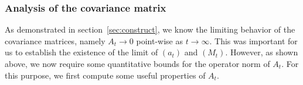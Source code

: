 
\subsubsection{Analysis of the covariance matrix}

As demonstrated in section~\ref{sec:construct}, we know the limiting behavior of the covariance matrices, namely 
\(A_t \to 0\) point-wise as \(t \to \infty\). This was important for us to establish the existence of the limit 
of \((a_t)\) and \((M_t)\). However, as shown above, we now require some quantitative bounds for the operator 
norm of \(A_t\). For this purpose, we first compute some useful properties of \(A_t\).

